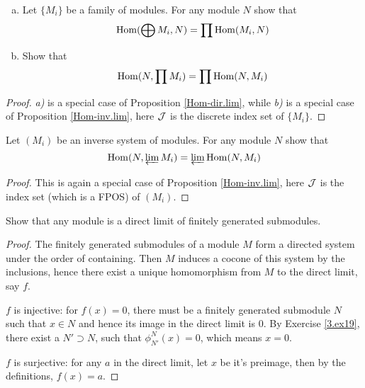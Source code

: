   \begin{ex}
    \begin{enumerate}[a)]
      \item Let $\{M_i\}$ be a family of modules. For any module $N$ show that
                \begin{equation*}
                  \operatorname{Hom}(\bigoplus M_i,N) = \prod\operatorname{Hom}(M_i,N)
                \end{equation*}
      \item Show that
               \begin{equation*}
                 \operatorname{Hom}(N,\prod M_i) = \prod\operatorname{Hom}(N,M_i)
               \end{equation*}
    \end{enumerate}
  \end{ex}
  \begin{proof}
    \emph{a)} is a special case of Proposition \ref{Hom-dir.lim}, while \emph{b)} is a special case of Proposition \ref{Hom-inv.lim}, here ${\cal J}$ is the discrete index set of $\{M_i\}$.
  \end{proof}

  \begin{ex}
    Let $(M_i)$ be an inverse system of modules. For any module $N$ show that
    \begin{equation*}
      \operatorname{Hom}(N,\operatorname*{\underleftarrow{\lim}} M_i) = \operatorname*{\underleftarrow{\lim}}\operatorname{Hom}(N,M_i)
    \end{equation*}
  \end{ex}
  \begin{proof}
    This is again a special case of Proposition \ref{Hom-inv.lim}, here ${\cal J}$ is the index set (which is a FPOS) of $(M_i)$.
  \end{proof}

  \begin{ex}\label{3.ex24}
    Show that any module is a direct limit of finitely generated submodules.
  \end{ex}
  \begin{proof}
    The finitely generated submodules of a module $M$ form a directed system under the order of containing.
    Then $M$ induces a cocone of this system by the inclusions, hence there exist a unique homomorphism from $M$ to the direct limit, say $f$.

    $f$ is injective: for $f(x)=0$, there must be a finitely generated submodule $N$ such that $x\in N$ and hence its image in the direct limit is $0$. By Exercise \ref{3.ex19}, there exist a $N'\supset N$, such that $\phi^N_{N'}(x)=0$, which means $x=0$.

    $f$ is surjective: for any $a$ in the direct limit, let $x$ be it's preimage, then by the definitions, $f(x)=a$.
  \end{proof}

